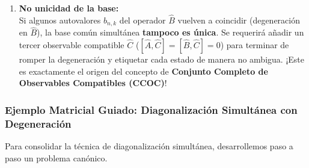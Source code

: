 \begin{enumerate}
    Existen exactamente $g_n$ combinaciones lineales ortonormales $\{\ket{\chi_{n, k}}\}_{k=1}^{g_n} \subset E_{a_n}$ tales que:
    \begin{equation}
        \hat{B}\ket{\chi_{n, k}} = b_{n, k}\ket{\chi_{n, k}}, \quad k \in \{1, 2, \dots, g_n\}.
    \end{equation}
    Y como cada $\ket{\chi_{n, k}}$ pertenece al subespacio $E_{a_n}$, automáticamente satisface:
    \begin{equation}
        \hat{A}\ket{\chi_{n, k}} = a_n \ket{\chi_{n, k}}.
    \end{equation}
    ¡Los vectores $\{\ket{\chi_{n, k}}\}$ son los autovectores comunes buscados!
    \item \textbf{No unicidad de la base:}\\
    Si algunos autovalores $b_{n, k}$ del operador $\hat{B}$ vuelven a coincidir (degeneración en $\hat{B}$), la base común simultánea \textbf{tampoco es única}. Se requerirá añadir un tercer observable compatible $\hat{C}$ ($[\hat{A}, \hat{C}] = [\hat{B}, \hat{C}] = 0$) para terminar de romper la degeneración y etiquetar cada estado de manera no ambigua. ¡Este es exactamente el origen del concepto de \textbf{Conjunto Completo de Observables Compatibles (CCOC)}!
\end{enumerate}

\subsubsection{Ejemplo Matricial Guiado: Diagonalización Simultánea con Degeneración}

Para consolidar la técnica de diagonalización simultánea, desarrollemos paso a paso un problema canónico.

